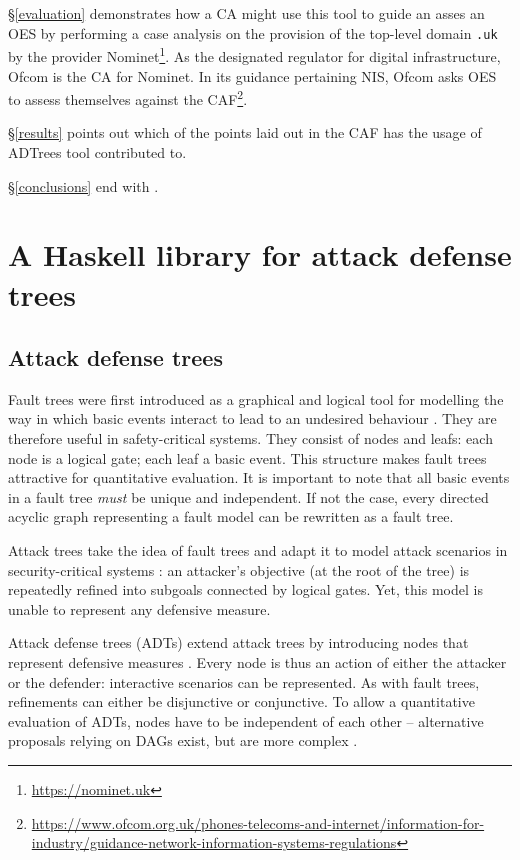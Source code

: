 \documentclass{scrreprt}
\begin{document}
\S\ref{evaluation} demonstrates how a CA might use this tool to guide an asses
an OES by performing a case analysis on the provision of the top-level domain
\texttt{.uk} by the provider Nominet\footnote{\url{https://nominet.uk}}. As the
designated regulator for digital infrastructure, Ofcom is the CA for Nominet. In
its guidance pertaining NIS, Ofcom asks OES to assess themselves against the
CAF\footnote{\url{https://www.ofcom.org.uk/phones-telecoms-and-internet/information-for-industry/guidance-network-information-systems-regulations}}.

\S\ref{results} points out which of the points laid out in the CAF has the usage
of ADTrees tool contributed to. \todo{}

\S\ref{conclusions} end with \todo{}.

\chapter{A Haskell library for attack defense trees}
\label{tool}

\section{Attack defense trees}

Fault trees were first introduced as a graphical and logical tool for modelling
the way in which basic events interact to lead to an undesired behaviour
\cite[IV.1]{Vesely1981}. They are therefore useful in safety-critical systems.
They consist of nodes and leafs: each node is a logical gate; each leaf a basic
event. This structure makes fault trees attractive for quantitative evaluation.
It is important to note that all basic events in a fault tree \textit{must} be
unique and independent. If not the case, every directed acyclic graph
representing a fault model can be rewritten as a fault tree.  

Attack trees take the idea of fault trees and adapt it to model attack scenarios
in security-critical systems \cite{Schneier1999} \cite{Brooke2003}
\cite{NaiFovino2009}: an attacker's objective
(at the root of the tree) is repeatedly refined into subgoals connected by
logical gates. Yet, this model is unable to represent any defensive measure.

Attack defense trees (ADTs) extend attack trees by introducing nodes that
represent defensive measures \cite{KordyFoundations}. Every node is thus an
action of either the attacker or the defender: interactive scenarios can be
represented.  As with fault trees, refinements can either be disjunctive or
conjunctive. To allow a quantitative evaluation of ADTs, nodes have to be
independent of each other -- alternative proposals relying on DAGs exist, but
are more complex \cite{KordyDAG}.
\end{document}
